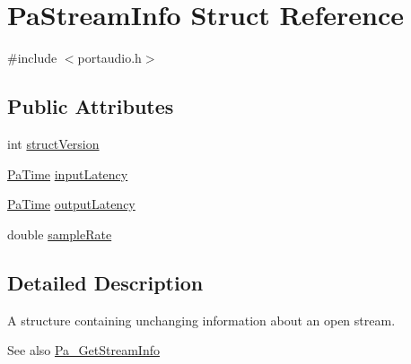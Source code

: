 \hypertarget{struct_pa_stream_info}{\section{Pa\+Stream\+Info Struct Reference}
\label{struct_pa_stream_info}
}


{\ttfamily \#include $<$portaudio.\+h$>$}

\subsection*{Public Attributes}
\begin{DoxyCompactItemize}
\item 
int \hyperlink{struct_pa_stream_info_a5e053a3f0f6232a5d1ec0dee0f9a943b}{struct\+Version}
\item 
\hyperlink{portaudio_8h_af17a7e6d0471a23071acf8dbd7bbe4bd}{Pa\+Time} \hyperlink{struct_pa_stream_info_a1f5339e0fef75cea66d9153235698399}{input\+Latency}
\item 
\hyperlink{portaudio_8h_af17a7e6d0471a23071acf8dbd7bbe4bd}{Pa\+Time} \hyperlink{struct_pa_stream_info_a372a81f39d90a85ae62225e9f57a7840}{output\+Latency}
\item 
double \hyperlink{struct_pa_stream_info_a9200fdee790d9155bc35d03be51ee2dd}{sample\+Rate}
\end{DoxyCompactItemize}


\subsection{Detailed Description}
A structure containing unchanging information about an open stream. \begin{DoxySeeAlso}{See also}
\hyperlink{portaudio_8h_a3d9c4cbda4e9f381b76f287c3de8a758}{Pa\+\_\+\+Get\+Stream\+Info} 
\end{DoxySeeAlso}


